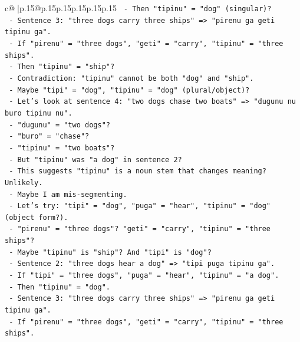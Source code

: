\documentclass{article}
\begin{document}
{\begin{supertabular}{c@{$\;$}|p{.15\linewidth}@{}p{.15\linewidth}p{.15\linewidth}p{.15\linewidth}p{.15\linewidth}p{.15\linewidth}}
{{{\texttt{                  {-} Then "tipinu" = "dog" (singular)?} \\
\texttt{                {-} Sentence 3: "three dogs carry three ships" => "pirenu ga geti tipinu ga".} \\
\texttt{                  {-} If "pirenu" = "three dogs", "geti" = "carry", "tipinu" = "three ships".} \\
\texttt{                  {-} Then "tipinu" = "ship"?} \\
\texttt{                  {-} Contradiction: "tipinu" cannot be both "dog" and "ship".} \\
\texttt{                  {-} Maybe "tipi" = "dog", "tipinu" = "dog" (plural/object)?} \\
\texttt{                  {-} Let's look at sentence 4: "two dogs chase two boats" => "dugunu nu buro tipinu nu".} \\
\texttt{                    {-} "dugunu" = "two dogs"?} \\
\texttt{                    {-} "buro" = "chase"?} \\
\texttt{                    {-} "tipinu" = "two boats"?} \\
\texttt{                    {-} But "tipinu" was "a dog" in sentence 2?} \\
\texttt{                    {-} This suggests "tipinu" is a noun stem that changes meaning? Unlikely.} \\
\texttt{                    {-} Maybe I am mis{-}segmenting.} \\
\texttt{                    {-} Let's try: "tipi" = "dog", "puga" = "hear", "tipinu" = "dog" (object form?).} \\
\texttt{                    {-} "pirenu" = "three dogs"? "geti" = "carry", "tipinu" = "three ships"?} \\
\texttt{                    {-} Maybe "tipinu" is "ship"? And "tipi" is "dog"?} \\
\texttt{                    {-} Sentence 2: "three dogs hear a dog" => "tipi puga tipinu ga".} \\
\texttt{                      {-} If "tipi" = "three dogs", "puga" = "hear", "tipinu" = "a dog".} \\
\texttt{                      {-} Then "tipinu" = "dog".} \\
\texttt{                    {-} Sentence 3: "three dogs carry three ships" => "pirenu ga geti tipinu ga".} \\
\texttt{                      {-} If "pirenu" = "three dogs", "geti" = "carry", "tipinu" = "three ships".} \\
}}}
\end{supertabular}}
\end{document}
